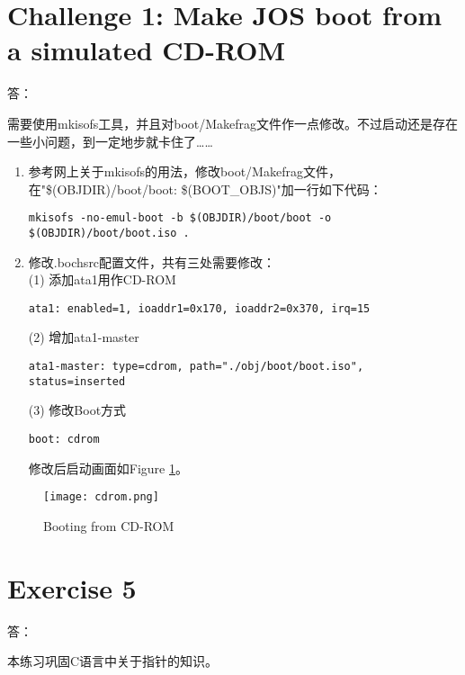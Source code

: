 \documentclass{article}
\begin{document}
\section{Challenge 1: Make JOS boot from a simulated CD-ROM}
\begin{Large}答：\end{Large}
需要使用mkisofs工具，并且对boot/Makefrag文件作一点修改。不过启动还是存在一些小问题，到一定地步就卡住了……\\
\begin{enumerate}
\item 参考网上关于mkisofs的用法，修改boot/Makefrag文件，在"\$(OBJDIR)/boot/boot: \$(BOOT\_OBJS)"加一行如下代码：
\begin{verbatim}
mkisofs -no-emul-boot -b $(OBJDIR)/boot/boot -o $(OBJDIR)/boot/boot.iso .
\end{verbatim}
\item 修改.bochsrc配置文件，共有三处需要修改：\\
(1) 添加ata1用作CD-ROM
\begin{verbatim}
ata1: enabled=1, ioaddr1=0x170, ioaddr2=0x370, irq=15
\end{verbatim}
(2) 增加ata1-master
\begin{verbatim}
ata1-master: type=cdrom, path="./obj/boot/boot.iso", status=inserted
\end{verbatim}
(3) 修改Boot方式
\begin{verbatim}
boot: cdrom
\end{verbatim}
修改后启动画面如Figure \ref{fig1}。
\end{enumerate}
\begin{figure}[!ht]
\texttt{[image: cdrom.png]}
\caption{Booting from CD-ROM}\label{fig1}
\end{figure}

\section{Exercise 5}
\begin{Large}答：\end{Large}
本练习巩固C语言中关于指针的知识。
\end{document}
